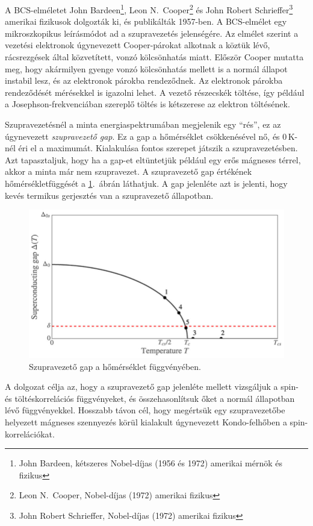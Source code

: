 \documentclass[a4paper,12pt,titlepage]{article}
\begin{document}
A BCS-elméletet John Bardeen\footnote{John Bardeen, kétszeres Nobel-díjas (1956 és 1972) amerikai mérnök és fizikus}, Leon N.\ Cooper\footnote{Leon N.\ Cooper, Nobel-díjas (1972) amerikai fizikus} és John Robert Schrieffer\footnote{John Robert Schrieffer, Nobel-díjas (1972) amerikai fizikus} amerikai fizikusok dolgozták ki, és publikálták 1957-ben.  A BCS-elmélet egy mikroszkopikus leírásmódot ad a szupravezetés jelenségére.  Az elmélet szerint a vezetési elektronok úgynevezett Cooper-párokat alkotnak a köztük lévő, rácsrezgések által közvetített, vonzó kölcsönhatás miatt.  Először Cooper mutatta meg, hogy akármilyen gyenge vonzó kölcsönhatás mellett is a normál állapot instabil lesz, és az elektronok párokba rendeződnek.  Az elektronok párokba rendeződését mérésekkel is igazolni lehet.  A vezető részecskék töltése, így például a Josephson-frekvenciában szereplő töltés is kétszerese az elektron töltésének.

Szupravezetésnél a minta energiaspektrumában megjelenik egy \enquote{rés}, ez az úgynevezett \emph{szupravezető gap}.  Ez a gap a hőmérséklet csökkenésével nő, és $0$\,K-nél éri el a maximumát.  Kialakulása fontos szerepet játszik a szupravezetésben.  Azt tapasztaljuk, hogy ha a gap-et eltüntetjük például egy erős mágneses térrel, akkor a minta már nem szupravezet.  A szupravezető gap értékének hőmérsékletfüggését a \ref{sc-gap}.\ ábrán láthatjuk.  A gap jelenléte azt is jelenti, hogy kevés termikus gerjesztés van a szupravezető állapotban.

\begin{figure}[h!]
	\centering
	\includegraphics[width=12cm]{sc_gap.png}
	\caption{Szupravezető gap a hőmérséklet függvényében. \cite{superconductor-gap}}
	\label{sc-gap}
\end{figure}

\newpage

A dolgozat célja az, hogy a szupravezető gap jelenléte mellett vizsgáljuk a spin- és töltéskorrelációs függvényeket, és összehasonlítsuk őket a normál állapotban lévő függvényekkel.  Hosszabb távon cél, hogy megértsük egy szupravezetőbe helyezett mágneses szennyezés körül kialakult úgynevezett Kondo-felhőben a spin-korrelációkat.
\end{document}
